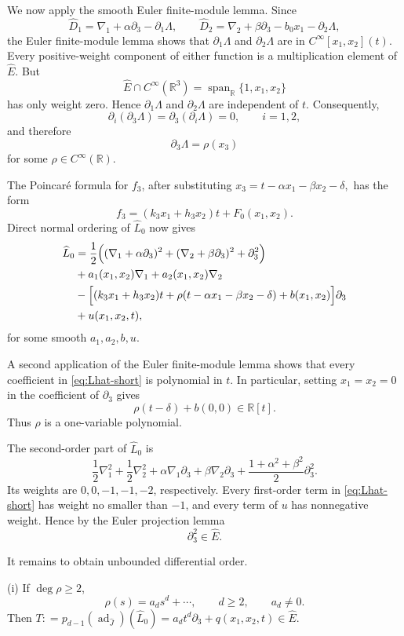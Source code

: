 \documentclass[11pt,a4paper]{article}
\numberwithin{equation}{section}
\theoremstyle{journalplain}
\theoremstyle{journaldef}
\DeclareMathOperator{\Span}{span}
\begin{document}
\begin{tcolorbox}[
  title={Proof of Theorem~\ref{thm:sector-I-smooth}},
  breakable
]
We now apply the smooth Euler finite-module lemma. Since
\[
\widehat D_1
=\nabla_1+\alpha \partial_3-\partial_1\Lambda,
\qquad
\widehat D_2
=\nabla_2+\beta \partial_3-b_0x_1-\partial_2\Lambda,
\]
the Euler finite-module lemma shows that \(\partial_1\Lambda\) and \(\partial_2\Lambda\)
are in $C^\infty[x_1,x_2](t)$.
Every positive-weight component of either function is a multiplication
element of \(\widehat E\). But
\[
\widehat E\cap C^\infty(\mathbb R^3)
=\Span_{\mathbb R}\{1,x_1,x_2\}
\]
has only weight zero. Hence \(\partial_1\Lambda\) and
\(\partial_2\Lambda\) are independent of \(t\). Consequently,
\[
\partial_i(\partial_3\Lambda)=\partial_3(\partial_i\Lambda)=0,
\qquad i=1,2,
\]
and therefore
\[
\partial_3\Lambda=\rho(x_3)
\]
for some \(\rho\in C^\infty(\mathbb R)\).

The Poincar\'e formula for \(f_3\), after substituting
\(
x_3=t-\alpha x_1-\beta x_2-\delta,
\)
has the form
\[
f_3=(k_3x_1+h_3x_2)t+F_0(x_1,x_2).
\]
Direct normal ordering of \(\widehat L_0\) now gives
\begin{align}
\widehat L_0
&=
\frac12\Bigl(
(\nabla_1+\alpha \partial_3)^2
+(\nabla_2+\beta \partial_3)^2
+\partial_3^2
\Bigr)\notag\\
&+a_1(x_1,x_2)\nabla_1+a_2(x_1,x_2)\nabla_2\notag\\
&-\Bigl[
(k_3x_1+h_3x_2)t
+\rho(t-\alpha x_1-\beta x_2-\delta)
+b(x_1,x_2)
\Bigr]\partial_3\notag\\
&+u(x_1,x_2,t),
\label{eq:Lhat-short}
\end{align}
for some smooth \(a_1,a_2,b,u\).

A second application of the Euler finite-module lemma shows that every
coefficient in \eqref{eq:Lhat-short} is polynomial in \(t\). In particular,
setting \(x_1=x_2=0\) in the coefficient of \(\partial_3\) gives
\[
\rho(t-\delta)+b(0,0)\in\mathbb R[t].
\]
Thus \(\rho\) is a one-variable polynomial.

The second-order part of \(\widehat L_0\) is
\[
\frac12\nabla_1^2+\frac12\nabla_2^2
+\alpha\nabla_1\partial_3+\beta\nabla_2\partial_3
+\frac{1+\alpha^2+\beta^2}{2}\partial_3^2.
\]
Its weights are \(0,0,-1,-1,-2\), respectively. Every first-order term
in \eqref{eq:Lhat-short} has weight no smaller than \(-1\), and every term of
\(u\) has nonnegative weight. Hence by the Euler projection lemma
\[
\partial_3^2\in\widehat E.
\]

It remains to obtain unbounded differential order.

(i) If $\deg \rho \ge 2$,
\[
\rho(s)=a_ds^d+\cdots,
\qquad d\ge2,\qquad a_d\neq0.
\]
Then
\(T:
=p_{d-1}(\operatorname{ad}_{\widehat J})(\widehat L_0) = a_dt^d\partial_3 + q(x_1,x_2,t)
\in\widehat E.\)


\end{tcolorbox}
\end{document}
